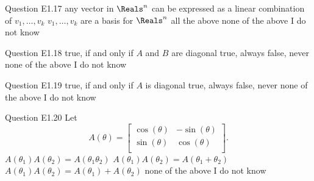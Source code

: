 \begin{frame}{Question E1.17}
	\QuestionAnswers
	{
		\answer any vector in $\Reals^{n}$ can be expressed as a linear combination of $v_{1}, \ldots, v_{k}$
		\answer $v_{1}, \ldots, v_{k}$ are a basis for $\Reals^{n}$
		\answer all the above
		\correctanswer none of the above
		\answer I do not know
	}
	\QuestionSolution{}
	\QuestionAuthor{}
	\QuestionVersion{}
\end{frame}


\begin{frame}{Question E1.18}
	\QuestionAnswers
	{
		\answer true, if and only if $A$ and $B$ are diagonal
		\answer true, always
		\answer false, never
		\correctanswer none of the above
		\answer I do not know
	}
	\QuestionSolution{}
	\QuestionAuthor{}
	\QuestionVersion{}
\end{frame}


\begin{frame}{Question E1.19}
	\QuestionAnswers
	{
		\answer true, if and only if $A$ is diagonal
		\correctanswer true, always
		\answer false, never
		\answer none of the above
		\answer I do not know
	}
	\QuestionSolution{}
	\QuestionAuthor{}
	\QuestionVersion{}
\end{frame}


\begin{frame}{Question E1.20}
	\QuestionBody
	{
		Let
		$$
		A(\theta)
		=
		\begin{bmatrix}
			\cos(\theta) & -\sin(\theta) \\
			\sin(\theta) & \cos(\theta) \\
		\end{bmatrix} .
		$$
	}
	\QuestionAnswers
	{
		\answer $A(\theta_{1}) A(\theta_{2}) = A\left( \theta_{1} \theta_{2} \right)$
		\correctanswer $A(\theta_{1}) A(\theta_{2}) = A\left( \theta_{1} + \theta_{2} \right)$
		\answer $A(\theta_{1}) A(\theta_{2}) = A \left( \theta_{1} \right) + A \left( \theta_{2} \right)$
		\answer none of the above
		\answer I do not know
	}
	\QuestionSolution{}
	\QuestionAuthor{}
	\QuestionVersion{}
\end{frame}


